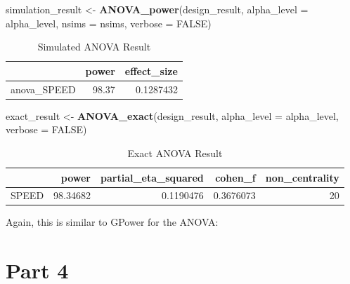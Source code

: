\documentclass[]{book}
\newenvironment{Shaded}{\begin{snugshade}}{\end{snugshade}}
\newcommand{\DataTypeTok}[1]{\textcolor[rgb]{0.13,0.29,0.53}{#1}}
\newcommand{\KeywordTok}[1]{\textcolor[rgb]{0.13,0.29,0.53}{\textbf{#1}}}
\newcommand{\NormalTok}[1]{#1}
\newcommand{\OtherTok}[1]{\textcolor[rgb]{0.56,0.35,0.01}{#1}}
\newcommand{\StringTok}[1]{\textcolor[rgb]{0.31,0.60,0.02}{#1}}
\begin{document}
\begin{Shaded}
\begin{Highlighting}[]
\NormalTok{simulation_result <-}\StringTok{ }\KeywordTok{ANOVA_power}\NormalTok{(design_result, }
                                 \DataTypeTok{alpha_level =}\NormalTok{ alpha_level, }
                                 \DataTypeTok{nsims =}\NormalTok{ nsims,}
                                 \DataTypeTok{verbose =} \OtherTok{FALSE}\NormalTok{)}
\end{Highlighting}
\end{Shaded}

\begin{table}[!h]

\caption{\label{tab:unnamed-chunk-133}Simulated ANOVA Result}
\centering
\begin{tabular}{l|r|r}
\hline
  & power & effect\_size\\
\hline
anova\_SPEED & 98.37 & 0.1287432\\
\hline
\end{tabular}
\end{table}

\begin{Shaded}
\begin{Highlighting}[]
\NormalTok{exact_result <-}\StringTok{ }\KeywordTok{ANOVA_exact}\NormalTok{(design_result,}
                            \DataTypeTok{alpha_level =}\NormalTok{ alpha_level,}
                            \DataTypeTok{verbose =} \OtherTok{FALSE}\NormalTok{)}
\end{Highlighting}
\end{Shaded}

\begin{table}[!h]

\caption{\label{tab:unnamed-chunk-135}Exact ANOVA Result}
\centering
\begin{tabular}{l|r|r|r|r}
\hline
  & power & partial\_eta\_squared & cohen\_f & non\_centrality\\
\hline
SPEED & 98.34682 & 0.1190476 & 0.3676073 & 20\\
\hline
\end{tabular}
\end{table}

Again, this is similar to GPower for the ANOVA:

\href{screenshots/gpower_4.png}{}

\hypertarget{part-4}{%
\section{Part 4}\label{part-4}}
\end{document}
